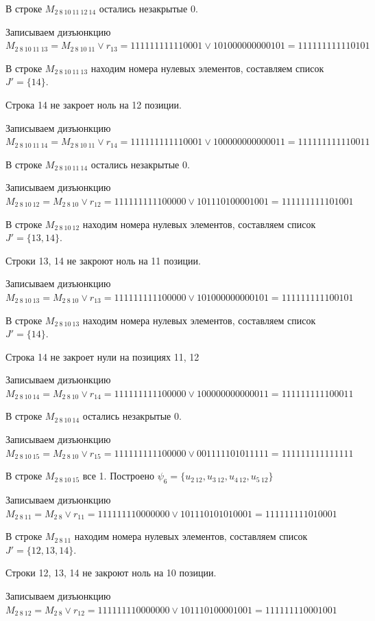 \documentclass{article}
\begin{document}
В строке $M_{2\ 8\ 10\ 11\ 12\ 14}$ остались незакрытые 0.

Записываем дизъюнкцию $M_{2\ 8\ 10\ 11\ 13} = M_{2\ 8\ 10\ 11}\lor r_{13} = 111111111110001 \lor 101000000000101 = 111111111110101$

В строке $M_{2\ 8\ 10\ 11\ 13}$ находим номера нулевых элементов, составляем список $J' = \{14\}$.

Строка 14 не закроет ноль на 12 позиции.

Записываем дизъюнкцию $M_{2\ 8\ 10\ 11\ 14} = M_{2\ 8\ 10\ 11}\lor r_{14} = 111111111110001 \lor 100000000000011 = 111111111110011$

В строке $M_{2\ 8\ 10\ 11\ 14}$ остались незакрытые 0.

Записываем дизъюнкцию $M_{2\ 8\ 10\ 12} = M_{2\ 8\ 10}\lor r_{12} = 111111111100000 \lor 101110100001001 = 111111111101001$

В строке $M_{2\ 8\ 10\ 12}$ находим номера нулевых элементов, составляем список $J' = \{13, 14\}$.

Строки 13, 14 не закроют ноль на 11 позиции.

Записываем дизъюнкцию $M_{2\ 8\ 10\ 13} = M_{2\ 8\ 10}\lor r_{13} = 111111111100000 \lor 101000000000101 = 111111111100101$

В строке $M_{2\ 8\ 10\ 13}$ находим номера нулевых элементов, составляем список $J' = \{14\}$.

Строка 14 не закроет нули на позициях 11, 12

Записываем дизъюнкцию $M_{2\ 8\ 10\ 14} = M_{2\ 8\ 10}\lor r_{14} = 111111111100000 \lor 100000000000011 = 111111111100011$

В строке $M_{2\ 8\ 10\ 14}$ остались незакрытые 0.

Записываем дизъюнкцию $M_{2\ 8\ 10\ 15} = M_{2\ 8\ 10}\lor r_{15} = 111111111100000 \lor 001111101011111 = 111111111111111$

В строке $M_{2\ 8\ 10\ 15}$ все 1. Построено $\psi_{6} = \{u_{2\ 12},u_{3\ 12},u_{4\ 12},u_{5\ 12}\}$

Записываем дизъюнкцию $M_{2\ 8\ 11} = M_{2\ 8}\lor r_{11} = 111111110000000 \lor 101110101010001 = 111111111010001$

В строке $M_{2\ 8\ 11}$ находим номера нулевых элементов, составляем список $J' = \{12, 13, 14\}$.

Строки 12, 13, 14 не закроют ноль на 10 позиции.

Записываем дизъюнкцию $M_{2\ 8\ 12} = M_{2\ 8}\lor r_{12} = 111111110000000 \lor 101110100001001 = 111111110001001$
\end{document}
